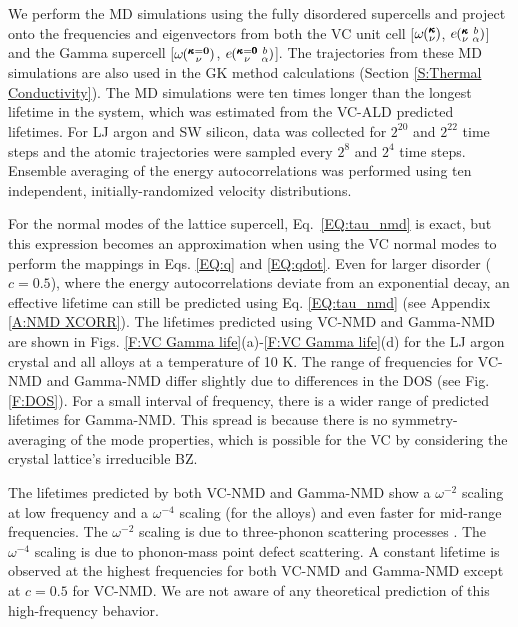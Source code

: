 \documentclass[12pt,twocolumn,iop]{/usr/share/texmf-texlive/tex/latex/iop/iopart}[/usr/share/texmf-texlive/tex/latex/iop/]
\newcommand{\kvba}{\mspace{-4.0mu}\left(\mspace{-8.0mu}
\begin{smallmatrix} &\pmb{\kappa} &b \\ &\nu &\alpha\end{smallmatrix}
\mspace{-3.0mu}\right)}
\newcommand{\kgvba}{\mspace{-4.0mu}\left(\mspace{-8.0mu}
\begin{smallmatrix} &\pmb{\kappa}=\pmb{0} &b \\ &\nu 
&\alpha\end{smallmatrix}\mspace{-3.0mu}\right)}
\newcommand{\kv}{\mspace{-4.0mu}\left(\mspace{-8.0mu}
\begin{smallmatrix}&\pmb{\kappa} \\&\nu\end{smallmatrix}
\mspace{-3.0mu}\right)}
\newcommand{\kgv}{\mspace{-4.0mu}\left(\mspace{-8.0mu}
\begin{smallmatrix}&\pmb{\kappa}=\mathbf{0} \\&\nu\end{smallmatrix}
\mspace{-3.0mu}\right)}
\begin{document}
We perform the MD simulations using the fully disordered supercells  
and project onto the frequencies and eigenvectors 
from both the VC unit cell [$\omega\kv$, $e\kvba$] and the 
Gamma supercell [$\omega\kgv$, $e\kgvba$]. 
The trajectories from 
these MD simulations are also used in the GK method calculations
(Section \ref{S:Thermal Conductivity}). 
The MD simulations were ten times longer than the 
longest lifetime in the system, which was  
estimated from the VC-ALD predicted lifetimes. For LJ 
argon and SW silicon, data was collected for $2^{20}$ and 
$2^{22}$ time steps and the atomic trajectories were sampled 
every $2^8$ and $2^4$ time steps. 
Ensemble averaging of the energy autocorrelations was performed 
using ten independent, initially-randomized velocity distributions. 

For the normal modes of the lattice supercell, 
Eq.~\eqref{EQ:tau_nmd} is exact, but this expression becomes an 
approximation when 
using the VC normal modes to perform the mappings in Eqs.  
\eqref{EQ:q} and \eqref{EQ:qdot}. 
Even for larger disorder ($c=0.5$),  
where the energy autocorrelations 
deviate from an exponential decay, 
an effective lifetime can still be predicted 
using Eq. \eqref{EQ:tau_nmd} (see Appendix \ref{A:NMD XCORR}). 
The lifetimes predicted using VC-NMD and Gamma-NMD  
are shown in Figs. \ref{F:VC Gamma life}(a)-\ref{F:VC Gamma life}(d) 
for the LJ argon crystal and all alloys at a temperature of 10 K. 
The range of frequencies for 
VC-NMD and Gamma-NMD differ slightly due to differences in 
the DOS (see Fig. \ref{F:DOS}). 
For a small interval of frequency, there is a wider range of 
predicted lifetimes for Gamma-NMD. This spread is because there 
is no symmetry-averaging of the mode properties, 
which is possible for the VC by considering the crystal 
lattice's irreducible BZ.\cite{ashcroft_solid_1976} 

The lifetimes predicted by both VC-NMD and Gamma-NMD 
show a $\omega^{-2}$ scaling at low frequency and a $\omega^{-4}$ 
scaling (for the alloys) and 
even faster for mid-range frequencies. The $\omega^{-2}$ scaling 
is due to three-phonon scattering processes
\cite{callaway_model_1959,maradudin_scattering_1962}. The 
$\omega^{-4}$ scaling is due to phonon-mass point defect 
scattering.\cite{klemens_scattering_1955,klemens_thermal_1957,
mattis_phonon_1957,tamura_isotope_1983} 
A constant lifetime is observed at the highest frequencies  
for both VC-NMD and Gamma-NMD except at $c=0.5$ for VC-NMD. We are not 
aware of any theoretical prediction of this high-frequency behavior.
\end{document}

